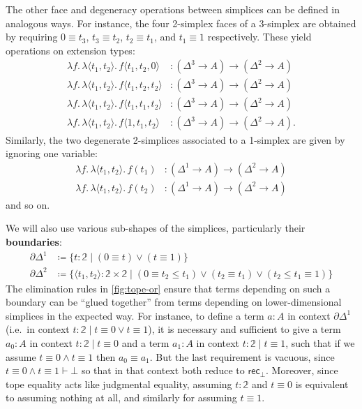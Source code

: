 \documentclass[12pt]{amsart}
\theoremstyle{plain}
\theoremstyle{definition}
\theoremstyle{remark}
\numberwithin{equation}{section}
\newcommand{\jdeq}{\equiv}
\newcommand{\defeq}{\coloneqq}
\newcommand{\types}{\vdash}
\newcommand{\sh}[2]{\{#1\mid #2\}}
\newcommand{\pair}[1]{\langle #1\rangle}
\newcommand{\rec}{\mathsf{rec}}
\newcommand{\lam}[1]{\lambda #1.\,}
\newcommand{\two}{\mathbb{2}}
\begin{document}
The other face and degeneracy operations between simplices can be defined in analogous ways.
For instance, the four 2-simplex faces of a 3-simplex are obtained by requiring $0\jdeq t_3$, $t_3\jdeq t_2$, $t_2\jdeq t_1$, and $t_1\jdeq 1$ respectively.
These yield operations on extension types:
\begin{align*}
  \lam{f} \lam{\pair{t_1,t_2}} f\pair{t_1,t_2,0} &: (\Delta^3 \to A) \to (\Delta^2 \to A)\\
  \lam{f} \lam{\pair{t_1,t_2}} f\pair{t_1,t_2,t_2} &: (\Delta^3 \to A) \to (\Delta^2 \to A)\\
  \lam{f} \lam{\pair{t_1,t_2}} f\pair{t_1,t_1,t_2} &: (\Delta^3 \to A) \to (\Delta^2 \to A)\\
  \lam{f} \lam{\pair{t_1,t_2}} f\pair{1,t_1,t_2} &: (\Delta^3 \to A) \to (\Delta^2 \to A).
\end{align*}
Similarly, the two degenerate 2-simplices associated to a 1-simplex are given by ignoring one variable:
\begin{align*}
  \lam{f} \lam{\pair{t_1,t_2}} f(t_1) &: (\Delta^1 \to A) \to (\Delta^2 \to A)\\
  \lam{f} \lam{\pair{t_1,t_2}} f(t_2) &: (\Delta^1 \to A) \to (\Delta^2 \to A)
\end{align*}
and so on.

We will also use various sub-shapes of the simplices, particularly their \textbf{boundaries}:
\begin{align*}
  \partial\Delta^1 &\defeq \sh{t:\two}{(0\jdeq t) \lor (t\jdeq 1)}\\
  \partial\Delta^2 &\defeq \sh{\pair{t_1,t_2}:\two\times\two}{(0\jdeq t_2\le t_1) \lor (t_2\jdeq t_1) \lor (t_2\le t_1 \jdeq 1)}
\end{align*}
The elimination rules in \cref{fig:tope-or} ensure that terms depending on such a boundary can be ``glued together'' from terms depending on lower-dimensional simplices in the expected way.
For instance, to define a term $a:A$ in context $\partial\Delta^1$ (i.e.\ in context $t:\two \mid t\jdeq 0 \lor t\jdeq 1$), it is necessary and sufficient to give a term $a_0:A$ in context $t:\two \mid t\jdeq 0$ and a term $a_1:A$ in context $t:\two\mid t\jdeq 1$, such that if we assume $t\jdeq 0 \land t\jdeq 1$ then $a_0\jdeq a_1$.
But the last requirement is vacuous, since $t\jdeq 0 \land t\jdeq 1 \types \bot$ so that in that context both reduce to $\rec_\bot$.
Moreover, since tope equality acts like judgmental equality, assuming $t:\two$ and $t\jdeq 0$ is equivalent to assuming nothing at all, and similarly {for assuming $t\jdeq 1$.}
\end{document}
